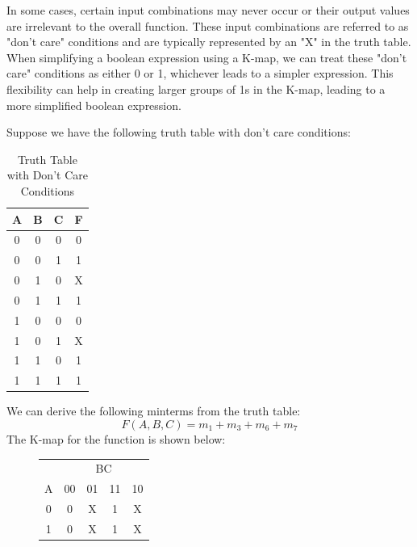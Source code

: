 \documentclass[11pt]{report}
\begin{document}
\begin{definition}
    In some cases, certain input combinations may never occur or their output values are irrelevant to the overall function. These input combinations are referred to as "don't care" conditions and are typically represented by an "X" in the truth table. When simplifying a boolean expression using a K-map, we can treat these "don't care" conditions as either 0 or 1, whichever leads to a simpler expression. This flexibility can help in creating larger groups of 1s in the K-map, leading to a more simplified boolean expression.
    
\end{definition}
\begin{example}
    Suppose we have the following truth table with don't care conditions:
    \begin{table}[h!]
        \centering
        \begin{tabular}{|c|c|c||c|}
            \hline
            A & B & C & F \\
            \hline
            0 & 0 & 0 & 0 \\
            0 & 0 & 1 & 1 \\
            0 & 1 & 0 & X \\
            0 & 1 & 1 & 1 \\
            1 & 0 & 0 & 0 \\
            1 & 0 & 1 & X \\
            1 & 1 & 0 & 1 \\
            1 & 1 & 1 & 1 \\
            \hline
        \end{tabular}
        \caption{Truth Table with Don't Care Conditions}
        \label{tab:example_dont_care_truth_table}
    \end{table}
    We can derive the following minterms from the truth table:
    $$
    F(A,B,C) = m_1 + m_3 + m_6 + m_7
    $$
    The K-map for the function is shown below:
    \begin{figure}[h!]
        \centering
        \begin{tabular}{c|c|c|c|c}
            & \multicolumn{4}{c}{BC} \\
            \cline{2-5}
            A & 00 & 01 & 11 & 10 \\
            \hline
            0 & 0 & X & 1 & X \\
            1 & 0 & X & 1 & X \\
        \end{tabular}

\end{figure}
\end{example}
\end{document}
